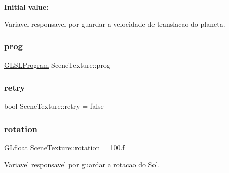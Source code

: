 {\bfseries Initial value\+:}
\begin{DoxyCode}{0}
\DoxyCodeLine{= \{}
\DoxyCodeLine{\}}

\end{DoxyCode}


Variavel responsavel por guardar a velocidade de translacao do planeta. 

\mbox{\label{class_scene_texture_abe4ceb019975a851e93b9fe39bc12850}} 
\subsubsection{\texorpdfstring{prog}{prog}}
{\footnotesize\ttfamily \mbox{\hyperlink{class_g_l_s_l_program}{G\+L\+S\+L\+Program}} Scene\+Texture\+::prog\hspace{0.3cm}{\ttfamily [private]}}

\mbox{\label{class_scene_texture_a9effaaef46b836601ba47ffc7b680a0a}} 
\subsubsection{\texorpdfstring{retry}{retry}}
{\footnotesize\ttfamily bool Scene\+Texture\+::retry = false\hspace{0.3cm}{\ttfamily [static]}}

\mbox{\label{class_scene_texture_aa57a081d184e1d120e1252bf9b282dec}} 
\subsubsection{\texorpdfstring{rotation}{rotation}}
{\footnotesize\ttfamily G\+Lfloat Scene\+Texture\+::rotation = 100.f\hspace{0.3cm}{\ttfamily [static]}}



Variavel responsavel por guardar a rotacao do Sol. 

